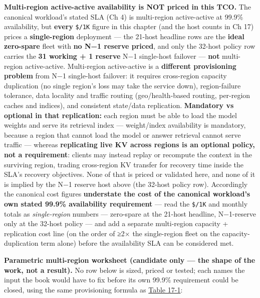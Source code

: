\textbf{Multi-region active-active availability is NOT priced in this
TCO.} The canonical workload's stated SLA (Ch 4) is multi-region
active-active at 99.9\% availability, but \textbf{every} \texttt{\$/1K}
figure in this chapter (and the host counts in Ch 17) prices a
\textbf{single-region} deployment --- the 21-host headline rows are the
\textbf{ideal zero-spare} fleet with \textbf{no N−1 reserve priced}, and
only the 32-host policy row carries the \textbf{31 working + 1 reserve}
N−1 single-host failover --- \textbf{not} multi-region active-active.
Multi-region active-active is a \textbf{different provisioning problem}
from N−1 single-host failover: it requires cross-region capacity
duplication (no single region's loss may take the service down),
region-failure tolerance, data locality and traffic routing
(geo/health-based routing, per-region caches and indices), and
consistent state/data replication. \textbf{Mandatory vs optional in that
replication:} each region must be able to load the model weights and
serve its retrieval index --- weight/index availability is mandatory,
because a region that cannot load the model or answer retrieval cannot
serve traffic --- whereas \textbf{replicating live KV across regions is
an optional policy, not a requirement}: clients may instead replay or
recompute the context in the surviving region, trading cross-region KV
transfer for recovery time inside the SLA's recovery objectives. None of
that is priced or validated here, and none of it is implied by the N−1
reserve host above (the 32-host policy row). Accordingly the canonical
cost figures \textbf{understate the cost of the canonical workload's own
stated 99.9\% availability requirement} --- read the \texttt{\$/1K} and
monthly totals as \emph{single-region} numbers --- zero-spare at the
21-host headline, N−1-reserve only at the 32-host policy --- and add a
separate multi-region capacity + replication cost line (on the order of
≥2× the single-region fleet on the capacity-duplication term alone)
before the availability SLA can be considered met.

\textbf{Parametric multi-region worksheet (candidate only --- the shape
of the work, not a result).} No row below is sized, priced or tested;
each names the input the book would have to fix before its own 99.9\%
requirement could be closed, using the same provisioning formula as
\hyperref[tab:17.1]{Table 17-1}:

